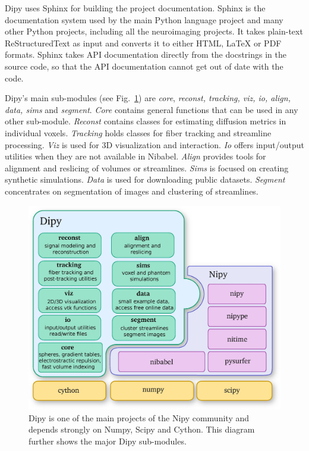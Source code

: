 \documentclass{bioinfo}
\begin{document}
Dipy uses Sphinx for building the project documentation. Sphinx is the
documentation system used by the main Python language project and many other
Python projects, including all the neuroimaging projects.  It takes plain-text
ReStructuredText as input and converts it to either HTML, LaTeX or PDF formats.
Sphinx takes API documentation directly from the docstrings in the source code,
so that the API documentation cannot get out of date with the code.

Dipy's main sub-modules (see Fig.~\ref{Fig:module_structure}) are \emph{core},
\emph{reconst, tracking, viz, io, align, data, sims} and \emph{segment}.
\emph{Core} contains general functions that can be used in any other sub-module.
\emph{Reconst} contains classes for estimating diffusion metrics in individual
voxels. \emph{Tracking} holds classes for fiber tracking and streamline
processing. \emph{Viz} is used for 3D visualization and interaction. \emph{Io}
offers input/output utilities when they are not available in Nibabel.
\emph{Align} provides tools for alignment and reslicing of volumes or
streamlines. \emph{Sims} is focused on creating synthetic simulations.
\emph{Data} is used for downloading public datasets. \emph{Segment} concentrates
on segmentation of images and clustering of streamlines.

\begin{figure}
\includegraphics[scale=0.42]{Figures/module_structure2.jpg}
\centering{}
\caption{Dipy is one of the main projects of the Nipy community and depends strongly
on Numpy, Scipy and Cython. This diagram further shows the major Dipy sub-modules.\label{Fig:module_structure}}
\end{figure}
\end{document}
